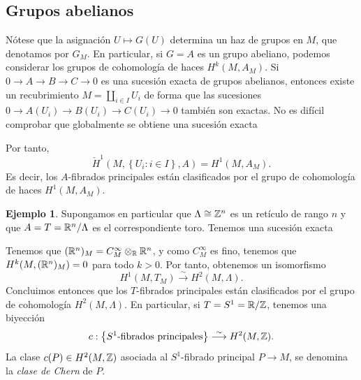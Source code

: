 \documentclass[11pt,a4paper]{amsbook}
\theoremstyle{remark} \newtheorem{rmk}[subsection]{Observación}
\theoremstyle{definition} \newtheorem{defn}[subsection]{Definición}
\theoremstyle{definition} \newtheorem{ex}[subsection]{Ejemplo}
\theoremstyle{definition} \newtheorem{ej}[subsection]{Ejercicio}
\begin{document}
\subsection{Grupos abelianos} Nótese que la asignación $U\mapsto G(U)$ determina un haz de grupos en $M$, que denotamos por $G_M$. En particular, si $G=A$ es un grupo abeliano, podemos considerar los grupos de cohomología de haces $H^k(M,A_M)$. Si $0\rightarrow A \rightarrow B \rightarrow C \rightarrow 0$ es una sucesión exacta de grupos abelianos, entonces existe un recubrimiento $M=\coprod_{i\in I} U_i$ de forma que las sucesiones $0\rightarrow A(U_i) \rightarrow B(U_i)\rightarrow C(U_i)\rightarrow 0$ también son exactas. No es difícil comprobar que globalmente se obtiene una sucesión exacta
\begin{center}
\end{center}
Por tanto,
\begin{equation*}
\check{H}^1(M,\left\{ U_i:i\in I \right\},A) = H^1(M,A_M).
\end{equation*}
Es decir, los $A$-fibrados principales están clasificados por el grupo de cohomología de haces $H^1(M,A_M)$.

\begin{ex}
Supongamos en particular que $\Lambda \cong \mathbb Z^n$ es un retículo de rango $n$ y que $A=T=\mathbb R^n/\Lambda$ es el correspondiente toro. Tenemos una sucesión exacta
\begin{center}
\end{center}
Tenemos que $(\mathbb R^n)_M=C^\infty_M \otimes_{\mathbb R} \mathbb R^n$, y como $C^\infty_M$ es fino, tenemos que $H^k(M,(\mathbb R^n)_M)=0$ para todo $k>0$. Por tanto, obtenemos un isomorfismo
\begin{equation*}
H^1(M,T_M) \overset{\sim}{\longrightarrow} H^2(M,\Lambda).
\end{equation*}
Concluimos entonces que los $T$-fibrados principales están clasificados por el grupo de cohomología $H^2(M,\Lambda)$. En particular, si $T=S^1=\mathbb R/\mathbb Z$, tenemos una biyección
\begin{equation*}
c:\left\{ S^1\text{-fibrados principales} \right\} \overset{\sim}{\longrightarrow} H^2(M,\mathbb Z).
\end{equation*}
La clase $c(P)\in H^2(M,\mathbb Z)$ asociada al $S^1$-fibrado principal $P\rightarrow M$, se denomina la \emph{clase de Chern} de $P$.
\end{ex}
\end{document}
